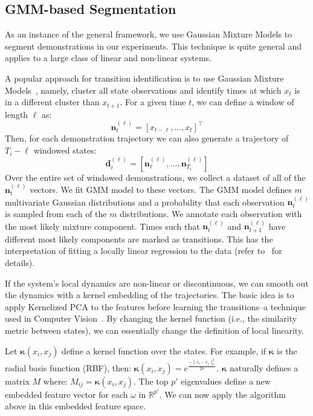\subsection{GMM-based Segmentation}
As an instance of the general framework, we use Gaussian Mixture Models to segment demonstrations in our experiments.
This technique is quite general and applies to a large class of linear and non-linear systems.

A popular approach for transition identification is to use Gaussian Mixture Models~\cite{calinon2014skills}, namely, cluster all state observations and identify times at which $x_t$ is in a different cluster than $x_{t+1}$.
For a given time $t$, we can define a window of length $\ell$ as:
\[
\mathbf{n}^{(\ell)}_t = [x_{t-\ell},...,x_{t}]^\intercal
\]
Then, for each demonstration trajectory we can also generate a trajectory of $T_i - \ell$ windowed states:
\[
\mathbf{d}^{(\ell)}_i = [\mathbf{n}^{(\ell)}_\ell,...,\mathbf{n}^{(\ell)}_{T_i}]
\]
Over the entire set of windowed demonstrations, we collect a dataset of all of the $\mathbf{n}^{(\ell)}_t$ vectors.
We fit GMM model to these vectors.
The GMM model defines $m$ multivariate Gaussian distributions and a probability that each observation $\mathbf{n}^{(\ell)}_t$ is sampled from each of the $m$ distributions.
We annotate each observation with the most likely mixture component.
Times such that $\mathbf{n}^{(\ell)}_t$ and $\mathbf{n}^{(\ell)}_{t+1}$ have different most likely components are marked as transitions.
This has the interpretation of fitting a locally linear regression to the data (refer to~\cite{moldovan2013dirichlet, khansari2011learning, kruger2010learning, krishnan2015tsc,murali2016} for details).

If the system's local dynamics are non-linear or discontinuous, we can smooth out the dynamics with a kernel embedding of the trajectories.
The basic idea is to apply Kernelized PCA to the features before learning the transitions--a technique used in Computer Vision~\cite{DBLP:conf/nips/MikaSSMSR98}.
By changing the kernel function (i.e., the similarity metric between states), we can essentially change the definition of local linearity.

Let $\mathbf{\kappa}(x_i,x_j)$ define a kernel function over the states.
For example, if $\mathbf{\kappa}$ is the radial basis function (RBF), then:
$ \mathbf{\kappa}(x_i,x_j) = e^{\frac{-\|x_i-x_j\|_2^2}{2\sigma}}$.
$\mathbf{\kappa}$ naturally defines a matrix $M$ where: $M_{ij} = \mathbf{\kappa}(x_i,x_j)$. 
The top $p'$ eigenvalues define a new embedded feature vector for each $\omega$ in $\mathbb{R}^{p'}$.
We can now apply the algorithm above in this embedded feature space.


